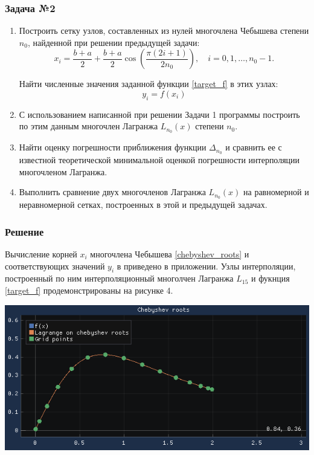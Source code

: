 \documentclass[a4paper, fontsize=14pt]{article}
\begin{document}
    \subsubsection*{Задача №2}
    \begin{enumerate}
        \item Построить сетку узлов, составленных из нулей многочлена Чебышева степени $n_0$, найденной при решении предыдущей задачи:
        \begin{equation}
            \label{chebyshev_roots}
            x_i=\frac{b+a}{2} + \frac{b+a}{2}  \cos \left(\frac{\pi (2i+1)}{2 n_0 }\right),  \quad  i=0,1,\dots,n_{0}-1.
        \end{equation}
        
        Найти численные значения заданной функции \eqref{target_f} в этих узлах: $$y_i=f(x_i)$$
        \item  С использованием написанной при решении Задачи 1 программы построить по этим данным многочлен Лагранжа $L_{n_0}(x)$ степени $n_0$.
        \item  Найти оценку погрешности приближения функции $\Delta_{n_0}$ и сравнить ее с известной теоретической минимальной оценкой погрешности интерполяции многочленом Лагранжа.
        \item  Выполнить сравнение двух многочленов Лагранжа $L_{n_0}(x)$ на равномерной и неравномерной сетках, построенных в этой и предыдущей задачах.
    \end{enumerate}
    \subsubsection*{Решение}
    Вычисление корней $x_i$ многочлена Чебышева \eqref{chebyshev_roots} и соответствующих значений $y_i$ в приведено в приложении. Узлы интерполяции, построенный по ним интерполяционный многолчен Лагранжа $L_{15}$ и фукнция \eqref{target_f} продемонстрированы на рисунке 4. 
    \begin{center}
        \includegraphics[]{src/chebyshev_roots.png}
    \end{center}
    
\end{document}
